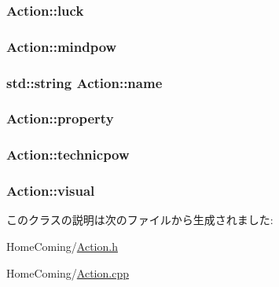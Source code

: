 \hypertarget{class_action_a209f3f40efe10c7516902b321f43b56b}{
\subsubsection[{luck}]{ {\bf Action\-::luck}}}\label{class_action_a209f3f40efe10c7516902b321f43b56b}
\hypertarget{class_action_a5b22a52083d8bc75f13acdf77cdedf20}{
\subsubsection[{mindpow}]{ {\bf Action\-::mindpow}}}\label{class_action_a5b22a52083d8bc75f13acdf77cdedf20}
\hypertarget{class_action_a94f19f635403e601f020ee971b5f78bf}{
\subsubsection[{name}]{\setlength{\rightskip}{0pt plus 5cm}std\-::string {\bf Action\-::name}}}\label{class_action_a94f19f635403e601f020ee971b5f78bf}
\hypertarget{class_action_ae8805db1217ff08170630a7ddab18aa0}{
\subsubsection[{property}]{ {\bf Action\-::property}}}\label{class_action_ae8805db1217ff08170630a7ddab18aa0}
\hypertarget{class_action_a2a6d89f853537367a98c5d917c05fd14}{
\subsubsection[{technicpow}]{ {\bf Action\-::technicpow}}}\label{class_action_a2a6d89f853537367a98c5d917c05fd14}
\hypertarget{class_action_a41f304752ab48d65bcb13841eb02b120}{
\subsubsection[{visual}]{ {\bf Action\-::visual}}}\label{class_action_a41f304752ab48d65bcb13841eb02b120}


このクラスの説明は次のファイルから生成されました\-:\begin{DoxyCompactItemize}
\item 
Home\-Coming/\hyperlink{_action_8h}{Action.\-h}\item 
Home\-Coming/\hyperlink{_action_8cpp}{Action.\-cpp}\end{DoxyCompactItemize}
